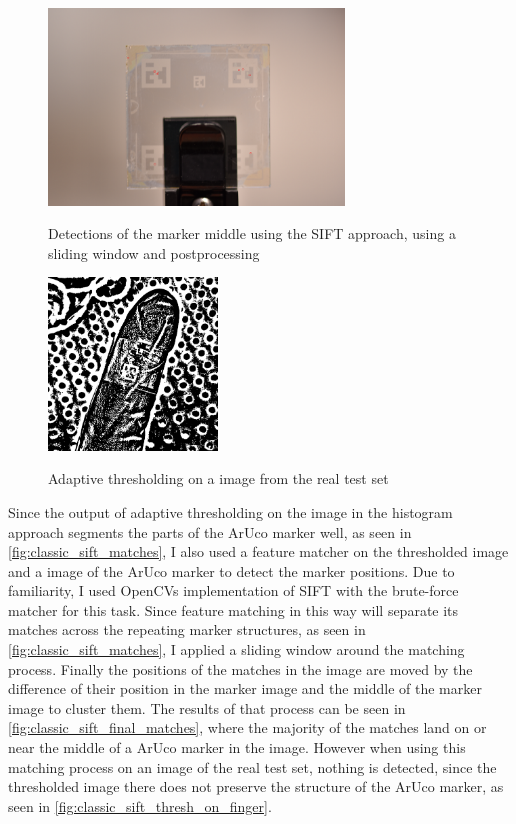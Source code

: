\documentclass[10pt]{book}
\begin{document}
\begin{figure}
  \caption{Detections of the marker middle using the \ac{SIFT} approach, using a sliding window and postprocessing}
  \includegraphics[width=0.7\textwidth]{image/classic_sift_final_matches}
  \label{fig:classic_sift_final_matches}
\end{figure}

\begin{figure}
  \caption{Adaptive thresholding on a image from the real test set}
  \includegraphics[width=0.4\textwidth]{image/classic_sift_thresh_on_finger}
  \label{fig:classic_sift_thresh_on_finger}
\end{figure}

Since the output of adaptive thresholding on the image in the histogram approach segments the parts of the \ac{ArUco} marker well, as seen in \autoref{fig:classic_sift_matches}, I also used a feature matcher on the thresholded image and a image of the \ac{ArUco} marker to detect the marker positions. Due to familiarity, I used \acp{OpenCV} implementation of \ac{SIFT} with the brute-force matcher for this task. Since feature matching in this way will separate its matches across the repeating marker structures, as seen in \autoref{fig:classic_sift_matches}, I applied a sliding window around the matching process. Finally the positions of the matches in the image are moved by the difference of their position in the marker image and the middle of the marker image to cluster them. The results of that process can be seen in \autoref{fig:classic_sift_final_matches}, where the majority of the matches land on or near the middle of a \ac{ArUco} marker in the image. However when using this matching process on an image of the real test set, nothing is detected, since the thresholded image there does not preserve the structure of the \ac{ArUco} marker, as seen in \autoref{fig:classic_sift_thresh_on_finger}.
\end{document}
